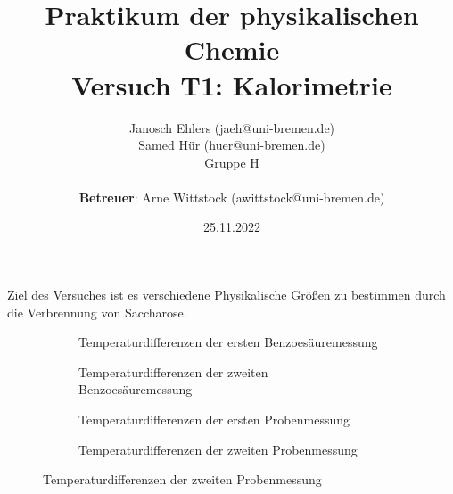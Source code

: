\documentclass[a4paper, 11pt]{article}
\title{Praktikum der physikalischen Chemie\\\large Versuch T1: Kalorimetrie}
\author{Janosch Ehlers (jaeh@uni-bremen.de)\\ Samed Hür (huer@uni-bremen.de)\\\small Gruppe H \\\\ \textbf{Betreuer}: Arne Wittstock (awittstock@uni-bremen.de)}
\date{25.11.2022}
\begin{document}
	\thispagestyle{empty}
	\maketitle
	\newpage

	Ziel des Versuches ist es verschiedene Physikalische Größen zu bestimmen durch die Verbrennung von Saccharose.





\begin{figure}
	\centering
	\begin{subfigure}{0.4\textwidth}
		\centering
		
		\caption{Temperaturdifferenzen der ersten Benzoesäuremessung}
	\end{subfigure}
	\hspace{5mm}
	\begin{subfigure}{0.4\textwidth}
		\centering
		
		\caption{Temperaturdifferenzen der zweiten Benzoesäuremessung}
	\end{subfigure}
	\hfill
	\begin{subfigure}{0.4\textwidth}
		\centering
		
		\caption{Temperaturdifferenzen der ersten Probenmessung}
	\end{subfigure}
	\hspace{5mm}
	\begin{subfigure}{0.4\textwidth}
		\centering
		
		\caption{Temperaturdifferenzen der zweiten Probenmessung}
	\end{subfigure}
\end{figure}


\printbibliography
\end{document}
